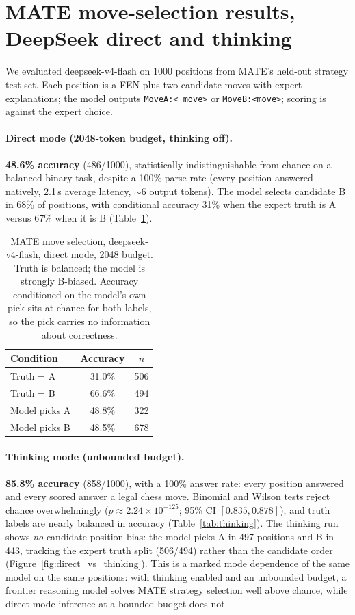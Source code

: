 \documentclass{article}
\begin{document}
\section{MATE move-selection results, DeepSeek direct and thinking}
\label{sec:mate}
We evaluated deepseek-v4-flash on 1000 positions from MATE's held-out
strategy test set. Each position is a FEN plus two candidate moves with
expert explanations; the model outputs \texttt{MoveA:\textless
move\textgreater} or \texttt{MoveB:\textless move\textgreater}; scoring
is against the expert choice.

\paragraph{Direct mode (2048-token budget, thinking off).}
\textbf{48.6\% accuracy} (486/1000), statistically indistinguishable
from chance on a balanced binary task, despite a 100\% parse rate (every
position answered natively, 2.1\,s average latency, $\sim$6 output
tokens). The model selects candidate B in 68\% of positions, with
conditional accuracy 31\% when the expert truth is A versus 67\% when it
is B (Table~\ref{tab:mate}).

\begin{table}[h]
\centering
\begin{tabular}{lcc}
\hline
Condition & Accuracy & $n$ \\ \hline
Truth = A & 31.0\% & 506 \\
Truth = B & 66.6\% & 494 \\
Model picks A & 48.8\% & 322 \\
Model picks B & 48.5\% & 678 \\ \hline
\end{tabular}
\caption{MATE move selection, deepseek-v4-flash, direct mode, 2048
budget. Truth is balanced; the model is strongly B-biased. Accuracy
conditioned on the model's own pick sits at chance for both labels, so
the pick carries no information about correctness.}
\label{tab:mate}
\end{table}

\paragraph{Thinking mode (unbounded budget).}
\textbf{85.8\% accuracy} (858/1000), with a 100\% answer rate: every
position answered and every scored answer a legal chess move. Binomial
and Wilson tests reject chance overwhelmingly ($p\approx
2.24\times10^{-125}$; 95\% CI $[0.835,0.878]$), and truth labels are
nearly balanced in accuracy (Table~\ref{tab:thinking}). The thinking run
shows \emph{no} candidate-position bias: the model picks A in 497
positions and B in 443, tracking the expert truth split (506/494) rather
than the candidate order (Figure~\ref{fig:direct_vs_thinking}). This is
a marked mode dependence of the same model on the same positions: with
thinking enabled and an unbounded budget, a frontier reasoning model
solves MATE strategy selection well above chance, while direct-mode
inference at a bounded budget does not.
\end{document}
